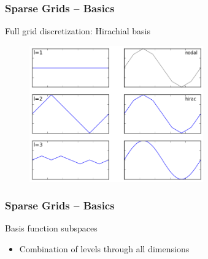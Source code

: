\begin{frame}
  \frametitle{Sparse Grids -- Basics}
  \topline
  \vspace{-10px}
  \begin{block}{Full grid discretization: Hirachial basis}
    \begin{figure}[!htp]
      \centering
      \includegraphics[width=7.5cm]{images/sparsegrid_1d}
      \vspace{-12px}
      \caption{}
    \end{figure}
  \end{block}
\end{frame}

\begin{frame}
  \frametitle{Sparse Grids -- Basics}
  \topline
  \vspace{-10px}
  \begin{block}{Basis function subspaces}
    \begin{itemize}
      \item Combination of levels through all dimensions
    \end{itemize}
  \end{block}
\end{frame}


